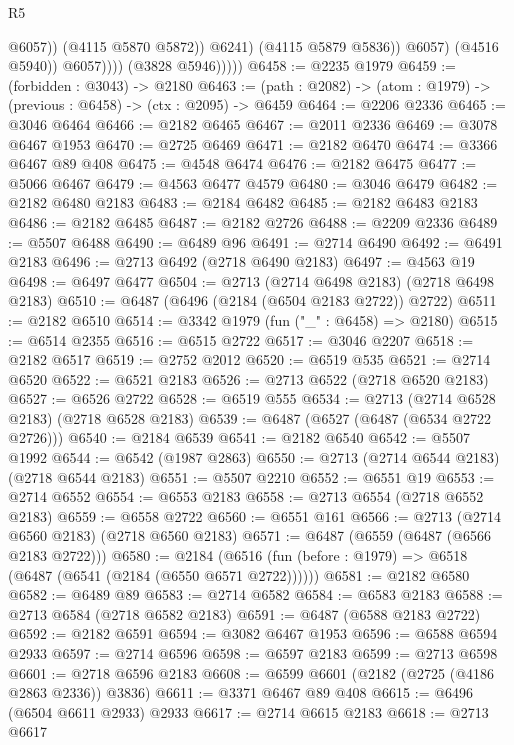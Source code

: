 \begin{lexlean}{R5}
\begin{coremodule}
                                  @6057))
                              (@4115 @5870 @5872))
                            @6241)
                          (@4115 @5879 @5836))
                        @6057)
                      (@4516 @5940))
                    @6057))))
            (@3828 @5946)))))
@6458 := @2235 @1979
@6459 := (forbidden : @3043) -> @2180
@6463 := (path : @2082) -> (atom : @1979) -> (previous : @6458) -> (ctx : @2095) -> @6459
@6464 := @2206 @2336
@6465 := @3046 @6464
@6466 := @2182 @6465
@6467 := @2011 @2336
@6469 := @3078 @6467 @1953
@6470 := @2725 @6469
@6471 := @2182 @6470
@6474 := @3366 @6467 @89 @408
@6475 := @4548 @6474
@6476 := @2182 @6475
@6477 := @5066 @6467
@6479 := @4563 @6477 @4579
@6480 := @3046 @6479
@6482 := @2182 @6480 @2183
@6483 := @2184 @6482
@6485 := @2182 @6483 @2183
@6486 := @2182 @6485
@6487 := @2182 @2726
@6488 := @2209 @2336
@6489 := @5507 @6488
@6490 := @6489 @96
@6491 := @2714 @6490
@6492 := @6491 @2183
@6496 := @2713 @6492 (@2718 @6490 @2183)
@6497 := @4563 @19
@6498 := @6497 @6477
@6504 := @2713 (@2714 @6498 @2183) (@2718 @6498 @2183)
@6510 := @6487 (@6496 (@2184 (@6504 @2183 @2722)) @2722)
@6511 := @2182 @6510
@6514 := @3342 @1979 (fun ("_" : @6458) => @2180)
@6515 := @6514 @2355
@6516 := @6515 @2722
@6517 := @3046 @2207
@6518 := @2182 @6517
@6519 := @2752 @2012
@6520 := @6519 @535
@6521 := @2714 @6520
@6522 := @6521 @2183
@6526 := @2713 @6522 (@2718 @6520 @2183)
@6527 := @6526 @2722
@6528 := @6519 @555
@6534 := @2713 (@2714 @6528 @2183) (@2718 @6528 @2183)
@6539 := @6487 (@6527 (@6487 (@6534 @2722 @2726)))
@6540 := @2184 @6539
@6541 := @2182 @6540
@6542 := @5507 @1992
@6544 := @6542 (@1987 @2863)
@6550 := @2713 (@2714 @6544 @2183) (@2718 @6544 @2183)
@6551 := @5507 @2210
@6552 := @6551 @19
@6553 := @2714 @6552
@6554 := @6553 @2183
@6558 := @2713 @6554 (@2718 @6552 @2183)
@6559 := @6558 @2722
@6560 := @6551 @161
@6566 := @2713 (@2714 @6560 @2183) (@2718 @6560 @2183)
@6571 := @6487 (@6559 (@6487 (@6566 @2183 @2722)))
@6580 := @2184 (@6516 (fun (before : @1979) => @6518 (@6487 (@6541 (@2184 (@6550 @6571 @2722))))))
@6581 := @2182 @6580
@6582 := @6489 @89
@6583 := @2714 @6582
@6584 := @6583 @2183
@6588 := @2713 @6584 (@2718 @6582 @2183)
@6591 := @6487 (@6588 @2183 @2722)
@6592 := @2182 @6591
@6594 := @3082 @6467 @1953
@6596 := @6588 @6594 @2933
@6597 := @2714 @6596
@6598 := @6597 @2183
@6599 := @2713 @6598
@6601 := @2718 @6596 @2183
@6608 := @6599 @6601 (@2182 (@2725 (@4186 @2863 @2336)) @3836)
@6611 := @3371 @6467 @89 @408
@6615 := @6496 (@6504 @6611 @2933) @2933
@6617 := @2714 @6615 @2183
@6618 := @2713 @6617

\end{coremodule}
\end{lexlean}
